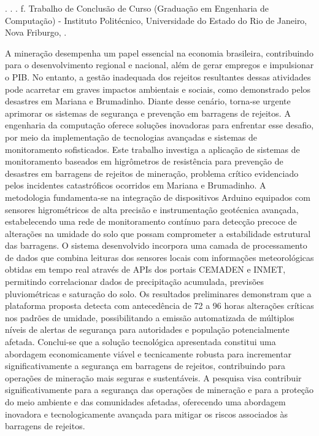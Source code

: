 \begin{resumo}
\begin{SingleSpace}

\noindent
\begin{flushleft}
\entradaAutor{}. \textit{\imprimirtitulo}. \the\year. \pageref{LastPage} f. Trabalho de Conclusão de Curso (Graduação em Engenharia de Computação) - Instituto Politécnico, Universidade do Estado do Rio de Janeiro, Nova Friburgo, \the\year.
\end{flushleft}
\vspace{\onelineskip}

\setlength{\parindent}{1.3cm}

A mineração desempenha um papel essencial na economia brasileira, contribuindo para o desenvolvimento regional e nacional, além de gerar empregos e impulsionar o PIB. No entanto, a gestão inadequada dos rejeitos resultantes dessas atividades pode acarretar em graves impactos ambientais e sociais, como demonstrado pelos desastres em Mariana e Brumadinho. Diante desse cenário, torna-se urgente aprimorar os sistemas de segurança e prevenção em barragens de rejeitos. A engenharia da computação oferece soluções inovadoras para enfrentar esse desafio, por meio da implementação de tecnologias avançadas e sistemas de monitoramento sofisticados. Este trabalho investiga a aplicação de sistemas de monitoramento baseados em higrômetros de resistência para prevenção de desastres em barragens de rejeitos de mineração, problema crítico evidenciado pelos incidentes catastróficos ocorridos em Mariana e Brumadinho. A metodologia fundamenta-se na integração de dispositivos Arduino equipados com sensores higrométricos de alta precisão e instrumentação geotécnica avançada, estabelecendo uma rede de monitoramento contínuo para detecção precoce de alterações na umidade do solo que possam comprometer a estabilidade estrutural das barragens. O sistema desenvolvido incorpora uma camada de processamento de dados que combina leituras dos sensores locais com informações meteorológicas obtidas em tempo real através de APIs dos portais CEMADEN e INMET, permitindo correlacionar dados de precipitação acumulada, previsões pluviométricas e saturação do solo. Os resultados preliminares demonstram que a plataforma proposta detecta com antecedência de 72 a 96 horas alterações críticas nos padrões de umidade, possibilitando a emissão automatizada de múltiplos níveis de alertas de segurança para autoridades e população potencialmente afetada. Conclui-se que a solução tecnológica apresentada constitui uma abordagem economicamente viável e tecnicamente robusta para incrementar significativamente a segurança em barragens de rejeitos, contribuindo para operações de mineração mais seguras e sustentáveis. A pesquisa visa contribuir significativamente para a segurança das operações de mineração e para a proteção do meio ambiente e das comunidades afetadas, oferecendo uma abordagem inovadora e tecnologicamente avançada para mitigar os riscos associados às barragens de rejeitos.


\end{SingleSpace}
\end{resumo}
